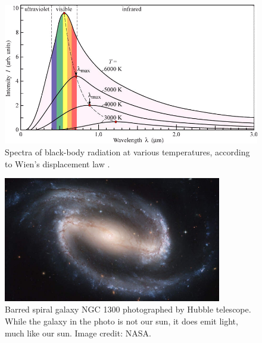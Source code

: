 \begin{refsection}
\begin{rotatepage}
\begin{figure}
    \centering
    \includegraphics[width=\textwidth]{figures/sampleFig2.png}
    \caption[Black-body radiation ddd dddd dddd]{Spectra of black-body radiation at various temperatures, according to Wien's displacement law \cite{wannier1987statistical}.}
    \label{fig:secondFig}
\end{figure}
\end{rotatepage}

\begin{figure}[ht]
    \centering
	\includegraphics[width=0.85\textwidth]{figures/sampleFig1.jpg} 
	\caption[Barred spiral galaxy NGC 1300]{Barred spiral galaxy NGC 1300 photographed by Hubble telescope. While the galaxy in the photo is not our sun, it does emit light, much like our sun. Image credit: NASA.}
	\label{fig:firstFig}
\end{figure}



\clearpage

\printbibliography[heading=subbibintoc, title={\texorpdfstring{\centering}{} Notes}]
\end{refsection}